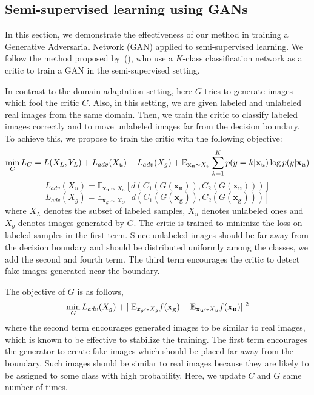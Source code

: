 \documentclass{article} \usepackage{iclr2018_conference,times}
\begin{document}
\vspace{-8mm}
\subsection{Semi-supervised learning using GANs}
      
In this section, we demonstrate the effectiveness of our method in training a Generative Adversarial Network (GAN) applied to semi-supervised learning.
We follow the method proposed by~(\cite{springenberg2015unsupervised,salimans2016improved}), who use a $K$-class classification network as a critic to train a GAN in the semi-supervised setting.

 In contrast to the domain adaptation setting, here $G$ tries to generate images which fool the critic $C$. Also, in this setting, we are given labeled and unlabeled real images from the same domain. Then, we train the critic to classify labeled  images correctly and to move unlabeled images far from the decision boundary. To achieve this, we propose to train the critic with the following objective:
\vspace{-3mm}
\begin{equation}
    \mathop{\rm min}\limits_{C} L_{C} = L(X_{L},Y_{L})+L_{adv}(X_{u})- L_{adv}(X_{g}) + {\mathbb{E}_{\mathbf{x_{u}}\sim X_{u}}}\sum_{k=1}^{K}p(y=k|{\mathbf x_{u}}) \log p(y|{\mathbf x_{u}})\\
  \end{equation}
\begin{equation}
  L_{adv}(X_{u}) = {\mathbb{E}_{\mathbf{x_{u}}\sim X_{u}}}[d(C_1(G(\mathbf{x_{u}})),C_2(G(\mathbf{x_{u}})))]
\end{equation}
\begin{equation}
  L_{adv}(X_{g}) = {\mathbb{E}_{\mathbf{x_{g}}\sim X_{G}}}[d(C_1(G(\mathbf{x_{g}})),C_2(G(\mathbf{x_{g}})))]
  \end{equation}
where $X_{L}$ denotes the subset of labeled samples, $X_{u}$ denotes unlabeled ones and $X_{g}$ denotes  images generated by $G$. The critic is trained to minimize the loss on labeled samples in the first term. Since unlabeled  images should be far away from the decision boundary and  should be distributed uniformly among the classes, we add the second and fourth term. The third term encourages the critic to detect fake images generated near the boundary. 

The objective of $G$ is as follows, 
\begin{equation}
  \mathop{\rm min}\limits_{G} L_{adv}(X_{g}) + ||{\mathbb{E}_{x_{g}\sim X_{g}}f(\mathbf{x_{g}})}-{\mathbb{E}_{\mathbf{x_{u}}\sim X_{u}}f(\mathbf{x_{u}})}||^2
  \end{equation}
where the second term encourages generated images to be similar to real images, which is known to be effective to stabilize the training. The first term encourages the generator to create fake images which should be placed far away from the boundary. Such images should be similar to real images because they are likely to be assigned to some class with high probability. 
Here, we update $C$ and $G$ same number of times. 
\end{document}
